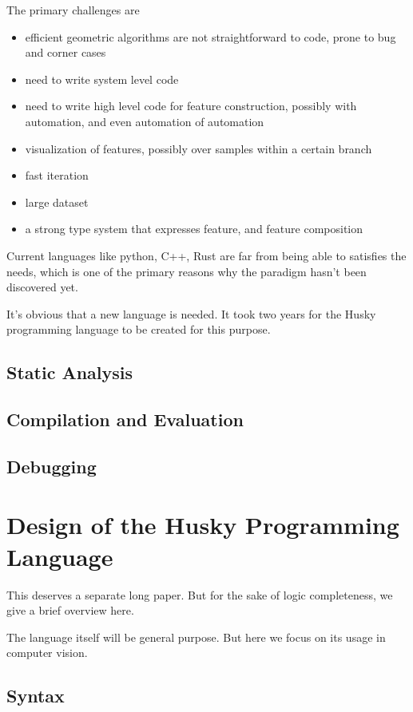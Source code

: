 \documentclass[11pt]{article} 	%
\theoremstyle{definition}
\begin{document}
The primary challenges are

\begin{itemize}
	\item efficient geometric algorithms are not straightforward to code, prone to bug and corner cases
	\item need to write system level code
	\item need to write high level code for feature construction, possibly with automation, and even automation of automation
	\item visualization of features, possibly over samples within a certain branch
	\item fast iteration
	\item large dataset
	\item a strong type system that expresses feature, and feature composition
\end{itemize}

Current languages like python, C++, Rust are far from being able to satisfies the needs, which is one of the primary reasons why the paradigm hasn't been discovered yet.

It's obvious that a new language is needed. It took two years for the Husky programming language to be created for this purpose.

\subsection{Static Analysis}

\subsection{Compilation and Evaluation}

\subsection{Debugging}


\section{Design of the Husky Programming Language}

This deserves a separate long paper. But for the sake of logic completeness, we give a brief overview here.

The language itself will be general purpose. But here we focus on its usage in computer vision.

\subsection{Syntax}
\end{document}
